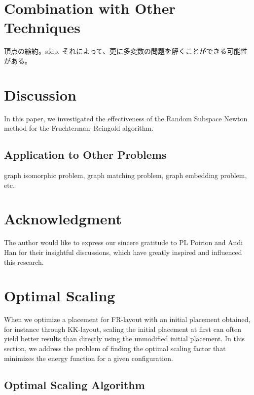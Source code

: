 \documentclass[dvipdfmx,journal]{IEEEtran}
\begin{document}
\section{Combination with Other Techniques}\label{sec:combination}

頂点の縮約。sfdp.
それによって、更に多変数の問題を解くことができる可能性がある。

\section{Discussion} \label{sec:discussion}

In this paper, we investigated the effectiveness of the Random Subspace Newton method for the Fruchterman--Reingold algorithm.

\subsection{Application to Other Problems}\label{ssec:application}

graph isomorphic problem, graph matching problem, graph embedding problem, etc.

\section{Acknowledgment}

The author would like to express our sincere gratitude to PL Poirion and Andi Han for their insightful discussions, which have greatly inspired and influenced this research.


\appendices

\section{Optimal Scaling}\label{sec:scaling}

When we optimize a placement for FR-layout with an initial placement obtained, for instance through KK-layout, scaling the initial placement at first can often yield better results than directly using the unmodified initial placement.
In this section, we address the problem of finding the optimal scaling factor that minimizes the energy function for a given configuration.

\subsection{Optimal Scaling Algorithm}\label{ssec:scalingAlgorithm}
\end{document}
